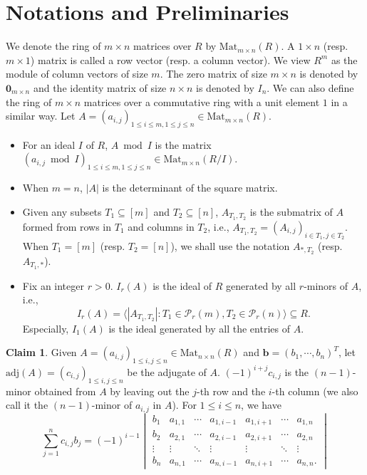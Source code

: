 \documentclass[a4paper, 11pt]{amsart}
\newcommand{\mc}[1]{\mathcal{#1}}
\newcommand{\ideala}[1]{\langle{#1}\rangle}
\newcommand{\td}[1]{\bm{#1}}
\newcommand{\tx}[1]{\text{#1}}
\theoremstyle{definition}
\newtheorem{claim}{Claim}
\theoremstyle{definition}
\begin{document}
	\section{Notations and Preliminaries}\label{sec:preliminaries}
	We denote the ring of $m\times n$ matrices over $R$ by $\tx{Mat}_{m\times n}(R)$. A $1\times n$ (resp. $m\times 1$) matrix is called a row vector (resp. a column vector). We view $R^m$ as the module of column vectors of size $m$. The zero matrix of size $m\times n$ is denoted by $\td{0}_{m\times n}$ and the identity matrix of size $n\times n$ is denoted by $I_n$. We can also define the ring of $m\times n$ matrices over a commutative ring with a unit element $1$ in a similar way. Let $A=(a_{i,j})_{1\leq i\leq m,1\leq j\leq n}\in\tx{Mat}_{m\times n}(R)$. 
	\begin{itemize}
		\item For an ideal $I$ of $R$, $A\bmod I$ is the matrix $(a_{i,j}\bmod I)_{1\leq i\leq m,1\leq j\leq n}\in\tx{Mat}_{m\times n}(R/I)$.
		\item When $m=n$, $|A|$ is the determinant of the square matrix.
		\item Given any subsets $T_1\subseteq[m]$ and $T_2\subseteq[n]$, $A_{T_1,T_2}$ is the submatrix of $A$ formed from rows in $T_1$ and columns in $T_2$, i.e., $A_{T_1,T_2}=(A_{i,j})_{i\in T_1,j\in T_2}$. When $T_1=[m]$ (resp. $T_2=[n]$), we shall use the notation $A_{*,T_2}$ (resp. $A_{T_1,*}$).
		\item Fix an integer $r>0$. $I_r(A)$ is the ideal of $R$ generated by all $r$-minors of $A$, i.e.,
		\begin{equation*}
			I_r(A)=\ideala{|A_{T_1,T_2}|:T_1\in\mc{P}_r(m),T_2\in\mc{P}_r(n)}\subseteq R.
		\end{equation*}
		Especially, $I_1(A)$ is the ideal generated by all the entries of $A$.
	\end{itemize}
	
	\begin{claim}\label{clm:minor}
		Given $A=(a_{i,j})_{1\leq i,j\leq n}\in\tx{Mat}_{n\times n}(R)$ and $\td{b}=(b_1,\cdots,b_n)^T$, let $\tx{adj}(A)=(c_{i,j})_{1\leq i,j\leq n}$ be the adjugate of $A$. $(-1)^{i+j}c_{i,j}$ is the $(n-1)$-minor obtained from $A$ by leaving out the $j$-th row and the $i$-th column (we also call it the $(n-1)$-minor of $a_{i,j}$ in $A$). For $1\leq i\leq n$, we have
		\begin{equation*}
			\sum^n_{j=1}c_{i,j}b_j=(-1)^{i-1}\begin{vmatrix}
				b_1&a_{1,1}&\cdots&a_{1,i-1}&a_{1,i+1}&\cdots&a_{1,n}\\
				b_2&a_{2,1}&\cdots&a_{2,i-1}&a_{2,i+1}&\cdots&a_{2,n}\\
				\vdots&\vdots&\ddots&\vdots&\vdots&\ddots&\vdots\\
				b_n&a_{n,1}&\cdots&a_{n,i-1}&a_{n,i+1}&\cdots&a_{n,n}.
			\end{vmatrix}
		\end{equation*}
	\end{claim}
	
\end{document}
